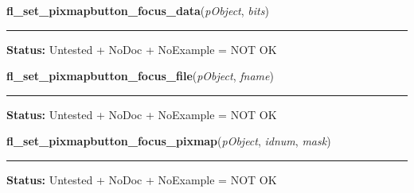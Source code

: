     \label{xformslib:library:fl_set_pixmapbutton_focus_data}

    \vspace{0.5ex}

\hspace{.8\funcindent}\begin{boxedminipage}{\funcwidth}

    \raggedright \textbf{fl\_set\_pixmapbutton\_focus\_data}(\textit{pObject}, \textit{bits})

    \vspace{-1.5ex}

    \rule{\textwidth}{0.5\fboxrule}
\setlength{\parskip}{2ex}
\setlength{\parskip}{1ex}
\textbf{Status:} Untested + NoDoc + NoExample = NOT OK



    \end{boxedminipage}

    \label{xformslib:library:fl_set_pixmapbutton_focus_file}

    \vspace{0.5ex}

\hspace{.8\funcindent}\begin{boxedminipage}{\funcwidth}

    \raggedright \textbf{fl\_set\_pixmapbutton\_focus\_file}(\textit{pObject}, \textit{fname})

    \vspace{-1.5ex}

    \rule{\textwidth}{0.5\fboxrule}
\setlength{\parskip}{2ex}
\setlength{\parskip}{1ex}
\textbf{Status:} Untested + NoDoc + NoExample = NOT OK



    \end{boxedminipage}

    \label{xformslib:library:fl_set_pixmapbutton_focus_pixmap}

    \vspace{0.5ex}

\hspace{.8\funcindent}\begin{boxedminipage}{\funcwidth}

    \raggedright \textbf{fl\_set\_pixmapbutton\_focus\_pixmap}(\textit{pObject}, \textit{idnum}, \textit{mask})

    \vspace{-1.5ex}

    \rule{\textwidth}{0.5\fboxrule}
\setlength{\parskip}{2ex}
\setlength{\parskip}{1ex}
\textbf{Status:} Untested + NoDoc + NoExample = NOT OK



    \end{boxedminipage}

